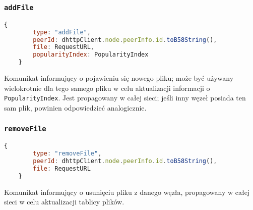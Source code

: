 % 

\subsubsection{\texttt{addFile}}
\begin{lstlisting}[language=javascript]
    {
        type: "addFile",
        peerId: dhttpClient.node.peerInfo.id.toB58String(),
        file: RequestURL,
        popularityIndex: PopularityIndex
    }
\end{lstlisting}

Komunikat informujący o pojawieniu się nowego pliku; może być używany wielokrotnie dla tego samego pliku w celu aktualizacji informacji o \texttt{PopularityIndex}. Jest propagowany w całej sieci; jeśli inny węzeł posiada ten sam plik, powinien odpowiedzieć analogicznie.


% 

\subsubsection{\texttt{removeFile}}
\begin{lstlisting}[language=javascript]
    {
        type: "removeFile",
        peerId: dhttpClient.node.peerInfo.id.toB58String(),
        file: RequestURL
    }
\end{lstlisting}

Komunikat informujący o usunięciu pliku z danego węzła, propagowany w całej sieci w celu aktualizacji tablicy plików.
